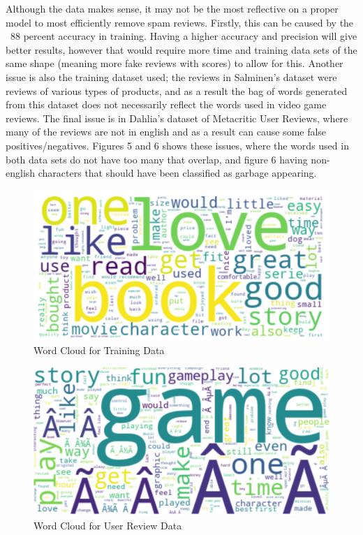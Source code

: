 \documentclass{article}
\begin{document}
\par Although the data makes sense, it may not be the most reflective on a proper model to most efficiently remove spam reviews. Firstly, this can be caused by the ~88 percent accuracy in training. Having a higher accuracy and precision will give better results, however that would require more time and training data sets of the same shape (meaning more fake reviews with scores) to allow for this. Another issue is also the training dataset used; the reviews in Salminen's dataset were reviews of various types of products, and as a result the bag of words generated from this dataset does not necessarily reflect the words used in video game reviews. The final issue is in Dahlia's dataset of Metacritic User Reviews, where many of the reviews are not in english and as a result can cause some false positives/negatives. Figures 5 and 6 shows these issues, where the words used in both data sets do not have too many that overlap, and figure 6 having non-english characters that should have been classified as garbage appearing.
\begin{figure}[h]
        \centering
        \includegraphics[scale=.4]{trainWords.png}
        \caption{Word Cloud for Training Data}
    \end{figure}
\begin{figure}[h]
        \centering
        \includegraphics[scale=.3]{testWords.png}
        \caption{Word Cloud for User Review Data}
    \end{figure}
    \\
\end{document}
